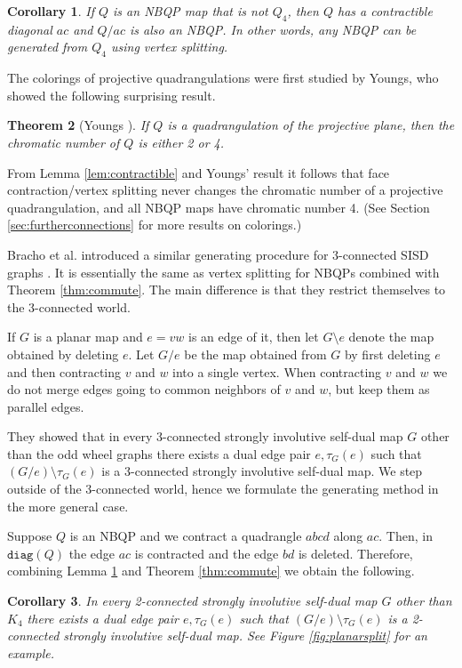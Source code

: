 \documentclass[10pt,a4paper]{article}
\newtheorem{theorem}{Theorem}[section]
\newtheorem{corollary}[theorem]{Corollary}
\newcounter{example}
\newcommand{\diag}[0]{\mathtt{diag}}
\begin{document}
\begin{corollary} \label{cor:contractible2}
    If $Q$ is an NBQP map that is not $Q_4$, then $Q$ has a contractible diagonal $ac$ and $Q/ac$ is also an NBQP. In other words, any NBQP can be generated from $Q_4$ using vertex splitting.
\end{corollary}

 The colorings of projective quadrangulations were first studied by Youngs, who showed the following surprising result. 

\begin{theorem}[Youngs \cite{YOU96}]\label{thm:youngs}
    If $Q$ is a quadrangulation of the projective plane, then the chromatic number of $Q$ is either 2 or 4.
\end{theorem}

From Lemma \ref{lem:contractible} and Youngs' result it follows that face contraction/vertex splitting never changes the chromatic number of a projective quadrangulation, and all NBQP maps have chromatic number 4. (See Section \ref{sec:furtherconnections} for more results on colorings.)


Bracho et al. introduced a similar generating procedure for 3-connected SISD graphs \cite{bracho2020strongly}. It is essentially the same as vertex splitting for NBQPs combined with Theorem \ref{thm:commute}. The main difference is that they restrict themselves to the 3-connected world. 

If $G$ is a planar map and $e=vw$ is an edge of it, then let $G\setminus e$ denote the map obtained by deleting $e$. Let $G/e$ be the map obtained from $G$ by first deleting $e$ and then contracting $v$ and $w$ into a single vertex. When contracting $v$ and $w$ we do not merge edges going to common neighbors of $v$ and $w$, but keep them as parallel edges.  

They showed that in every 3-connected strongly involutive self-dual map $G$ other than the odd wheel graphs there exists a dual edge pair $e,\tau_G(e)$ such that $(G/ e)\setminus \tau_G(e)$ is a 3-connected strongly involutive self-dual map. We step outside of the 3-connected world, hence we formulate the generating method in the more general case.


Suppose $Q$ is an NBQP and we contract a quadrangle $abcd$ along $ac$. Then, in $\diag(Q)$ the edge $ac$ is contracted and the edge $bd$ is deleted. Therefore, combining Lemma \ref{cor:contractible2} and Theorem \ref{thm:commute} we obtain the following.

\begin{corollary}\label{cor:generatingsisdgraphs}
     In every 2-connected strongly involutive self-dual map $G$ other than $K_4$ there exists a dual edge pair $e,\tau_G(e)$ such that $(G/ e)\setminus \tau_G(e)$ is a 2-connected strongly involutive self-dual map. See Figure \ref{fig:planarsplit} for an example. 
\end{corollary}
\end{document}
